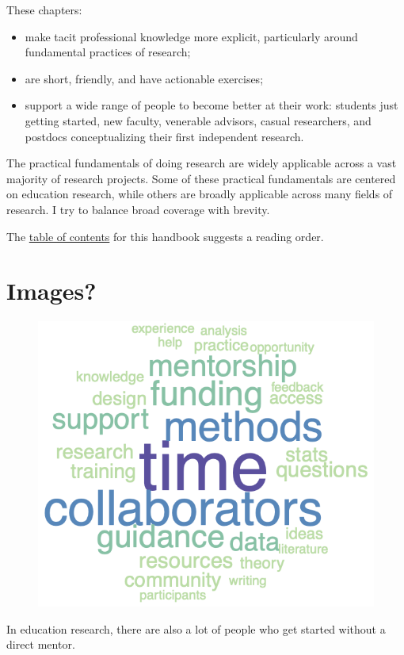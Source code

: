 \documentclass[
  letterpaper,
]{report}
\providecommand{\tightlist}{%
  \setlength{\itemsep}{0pt}\setlength{\parskip}{0pt}}\usepackage{longtable,booktabs,array}
\begin{document}
These chapters:

\begin{itemize}
\tightlist
\item
  make tacit professional knowledge more explicit, particularly around
  fundamental practices of research;
\item
  are short, friendly, and have actionable exercises;
\item
  support a wide range of people to become better at their work:
  students just getting started, new faculty, venerable advisors, casual
  researchers, and postdocs conceptualizing their first independent
  research.
\end{itemize}

The practical fundamentals of doing research are widely applicable
across a vast majority of research projects. Some of these practical
fundamentals are centered on education research, while others are
broadly applicable across many fields of research. I try to balance
broad coverage with brevity.

The \href{articles}{table of contents} for this handbook suggests a
reading order.

\section{Images?}\label{images}

\begin{figure}[H]


{\centering \includegraphics[width=0.5\linewidth,height=\textheight,keepaspectratio]{images/research-needs.png}

}

\end{figure}%

In education research, there are also a lot of people who get started
without a direct mentor.
\end{document}
